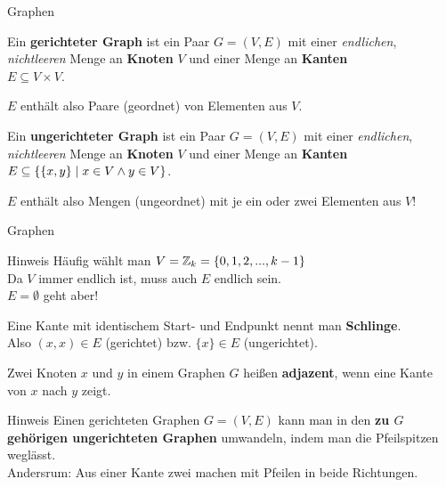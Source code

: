 \begin{frame}{Graphen}
	\begin{Definition}
		Ein \textbf{gerichteter Graph} ist ein Paar $G = (V, E)$ mit einer \emph{endlichen}, \emph{nichtleeren} Menge an \textbf{Knoten} $V$ und einer Menge an \textbf{Kanten}\\
		$E \subseteq V \times V$.
	\end{Definition} \pause
	$E$ enthält also Paare (geordnet) von Elementen aus $V$. \pause
	
	\bigskip
	\begin{Definition}
		Ein \textbf{ungerichteter Graph} ist ein Paar $G = (V, E)$ mit einer \emph{endlichen}, \emph{nichtleeren} Menge an \textbf{Knoten} $V$ und einer Menge an \textbf{Kanten}\\
		$E \subseteq \left\{ \{x,y\} \;\middle|\; x \in V \land y \in V \right\}$.
	\end{Definition} \pause
	$E$ enthält also Mengen (ungeordnet) mit je ein oder zwei Elementen aus $V$!
\end{frame}

\begin{frame}{Graphen}
	\begin{block}{Hinweis}
		Häufig wählt man $V = \mathbb{Z}_k = \{0,1,2,...,k-1\}$\\
		
		Da $V$ immer endlich ist, muss auch $E$ endlich sein.\\
		$E = \emptyset$ geht aber!
	\end{block}

	\pause
	\begin{Definition}
		Eine Kante mit identischem Start- und Endpunkt nennt man \textbf{Schlinge}.\\
		Also $(x,x) \in E$ (gerichtet) bzw. $\{x\} \in E$ (ungerichtet).\\
		\smallskip
		
		Zwei Knoten $x$ und $y$ in einem Graphen $G$ heißen \textbf{adjazent}, wenn eine Kante von $x$ nach $y$ zeigt.
	\end{Definition}

	\pause

	\begin{block}{Hinweis}
		Einen gerichteten Graphen $G = (V,E)$ kann man in den \textbf{zu $G$ gehörigen ungerichteten Graphen} umwandeln, indem man die Pfeilspitzen weglässt. \\
		Andersrum: Aus einer Kante zwei machen mit Pfeilen in beide Richtungen.
	\end{block}
\end{frame}

